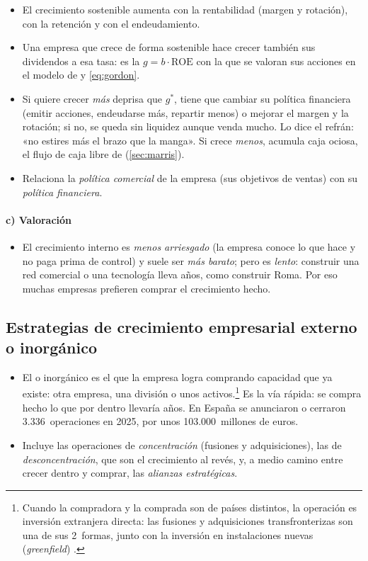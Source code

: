 \documentclass[11pt]{article}
\begin{document}
\begin{itemize}
\item El crecimiento sostenible aumenta con la rentabilidad (margen y rotación), con la retención y con el endeudamiento.
\item Una empresa que crece de forma sostenible hace crecer también sus dividendos a esa tasa: es la $g=b\cdot\mathrm{ROE}$ con la que se valoran sus acciones en el modelo de  y  \eqref{eq:gordon}.
\item Si quiere crecer \emph{más} deprisa que $g^{*}$, tiene que cambiar su política financiera (emitir acciones, endeudarse más, repartir menos) o mejorar el margen y la rotación; si no, se queda sin liquidez aunque venda mucho. Lo dice el refrán: «no estires más el brazo que la manga». Si crece \emph{menos}, acumula caja ociosa, el flujo de caja libre de  (\ref{sec:marris}).
\item Relaciona la \emph{política comercial} de la empresa (sus objetivos de ventas) con su \emph{política financiera}.
\end{itemize}

\paragraph{c) Valoración}

\begin{itemize}
\item El crecimiento interno es \emph{menos arriesgado} (la empresa conoce lo que hace y no paga prima de control) y suele ser \emph{más barato}; pero es \emph{lento}: construir una red comercial o una tecnología lleva años, como construir Roma. Por eso muchas empresas prefieren comprar el crecimiento hecho.
\end{itemize}

\subsection{Estrategias de crecimiento empresarial externo o inorgánico}\label{sec:externo}

\begin{itemize}
\item El  o inorgánico es el que la empresa logra comprando capacidad que ya existe: otra empresa, una división o unos activos.\footnote{Cuando la compradora y la comprada son de países distintos, la operación es inversión extranjera directa: las fusiones y adquisiciones transfronterizas son una de sus 2~formas, junto con la inversión en instalaciones nuevas (\emph{greenfield}) .} Es la vía rápida: se compra hecho lo que por dentro llevaría años. En España se anunciaron o cerraron 3.336~operaciones en 2025, por unos 103.000~millones de euros\nocite{TTR2026Anual}.
\item Incluye las operaciones de \emph{concentración} (fusiones y adquisiciones), las de \emph{desconcentración}, que son el crecimiento al revés, y, a medio camino entre crecer dentro y comprar, las \emph{alianzas estratégicas}.
\end{itemize}
\end{document}
